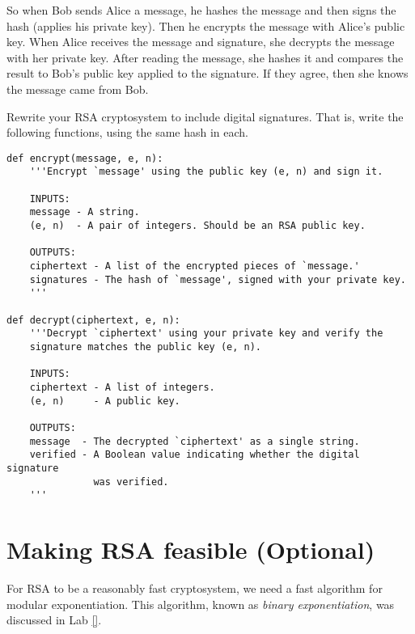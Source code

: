 So when Bob sends Alice a message, he hashes the message and then signs the hash (applies his private key).
Then he encrypts the message with Alice's public key. 
When Alice receives the message and signature, she decrypts the message with her private key.
After reading the message, she hashes it and compares the result to Bob's public key applied to the signature.
If they agree, then she knows the message came from Bob.

\begin{problem}
Rewrite your RSA cryptosystem to include digital signatures. 
That is, write the following functions, using the same hash in each.
\begin{lstlisting}
def encrypt(message, e, n):
    '''Encrypt `message' using the public key (e, n) and sign it.
    
    INPUTS:
    message - A string.
    (e, n)  - A pair of integers. Should be an RSA public key.
    
    OUTPUTS:
    ciphertext - A list of the encrypted pieces of `message.'
    signatures - The hash of `message', signed with your private key.
    '''
    
def decrypt(ciphertext, e, n):
    '''Decrypt `ciphertext' using your private key and verify the 
    signature matches the public key (e, n).
    
    INPUTS:
    ciphertext - A list of integers.
    (e, n)     - A public key.
    
    OUTPUTS:
    message  - The decrypted `ciphertext' as a single string.
    verified - A Boolean value indicating whether the digital signature 
               was verified.
    '''
\end{lstlisting}
\end{problem}




















\section*{Making RSA feasible (Optional)}

For RSA to be a reasonably fast cryptosystem, we need a fast algorithm for modular exponentiation.
This algorithm, known as \emph{binary exponentiation}, was discussed in Lab \ref{}.

